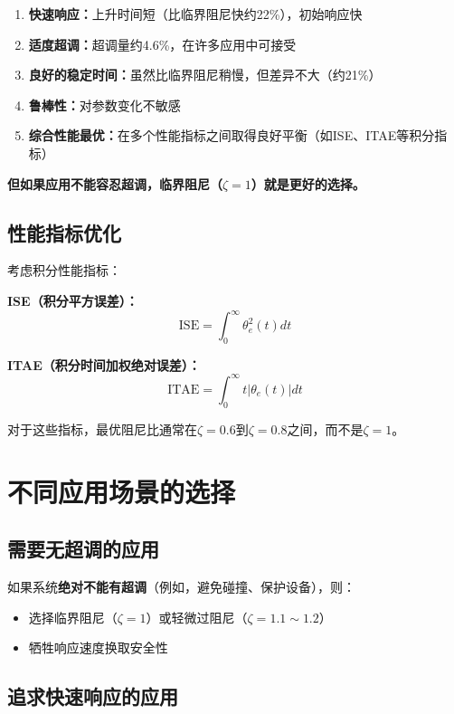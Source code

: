 \documentclass[12pt,a4paper]{article}
\begin{document}
\begin{enumerate}
\item \textbf{快速响应：}上升时间短（比临界阻尼快约22\%），初始响应快
\item \textbf{适度超调：}超调量约4.6\%，在许多应用中可接受
\item \textbf{良好的稳定时间：}虽然比临界阻尼稍慢，但差异不大（约21\%）
\item \textbf{鲁棒性：}对参数变化不敏感
\item \textbf{综合性能最优：}在多个性能指标之间取得良好平衡（如ISE、ITAE等积分指标）
\end{enumerate}

\textbf{但如果应用不能容忍超调，临界阻尼（$\zeta = 1$）就是更好的选择。}

\subsection{性能指标优化}

考虑积分性能指标：

\textbf{ISE（积分平方误差）：}
\begin{equation}
\text{ISE} = \int_0^{\infty} \theta_e^2(t) dt
\end{equation}

\textbf{ITAE（积分时间加权绝对误差）：}
\begin{equation}
\text{ITAE} = \int_0^{\infty} t|\theta_e(t)| dt
\end{equation}

对于这些指标，最优阻尼比通常在$\zeta = 0.6$到$\zeta = 0.8$之间，而不是$\zeta = 1$。

\section{不同应用场景的选择}

\subsection{需要无超调的应用}

如果系统\textbf{绝对不能有超调}（例如，避免碰撞、保护设备），则：
\begin{itemize}
\item 选择临界阻尼（$\zeta = 1$）或轻微过阻尼（$\zeta = 1.1 \sim 1.2$）
\item 牺牲响应速度换取安全性
\end{itemize}

\subsection{追求快速响应的应用}
\end{document}

